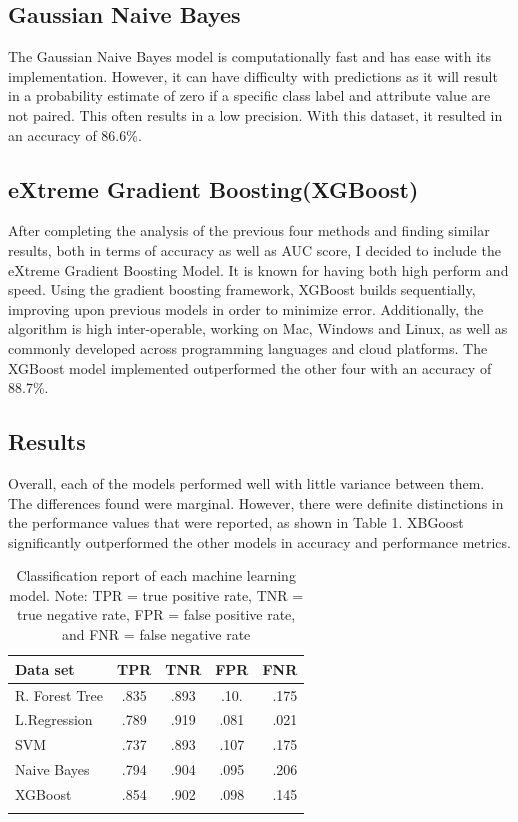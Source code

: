 \documentclass{article}
\begin{document}
\subsection{Gaussian Naive Bayes}
The Gaussian Naive Bayes model is computationally fast and has ease with its implementation. However, it can have difficulty with predictions as it will result in a probability estimate of zero if a specific class label and attribute value are not paired. This often results in a low precision. With this dataset, it resulted in an accuracy of 86.6\%. 
\subsection{eXtreme Gradient Boosting(XGBoost)}
After completing the analysis of the previous four methods and finding similar results, both in terms of accuracy as well as AUC score, I decided to include the eXtreme Gradient Boosting Model. It is known for having both high perform and speed. Using the gradient boosting framework, XGBoost builds sequentially, improving upon previous models in order to minimize error. Additionally, the algorithm is high inter-operable, working on Mac, Windows and Linux, as well as commonly developed across programming languages and cloud platforms. The XGBoost model implemented outperformed the other four with an accuracy of 88.7\%.
\subsection{Results}
Overall, each of the models performed well with little variance between them. The differences found were marginal. However, there were definite distinctions in the performance values that were reported, as shown in Table 1. XBGoost significantly outperformed the other models in accuracy and performance metrics. 

\begin{table}[t]
\caption{Classification report of each machine learning model. Note: TPR = true positive rate, TNR = true negative rate, FPR = false positive rate, and FNR = false negative rate}
\label{sample-table}
\vskip 0.15in
\begin{center}
\begin{small}
\begin{sc}
\begin{tabular}{lcccr}
\hline
\abovespace\belowspace
Data set & TPR & TNR & FPR & FNR\\
\hline
\abovespace
R. Forest Tree    & .835 & .893  & .10. &.175 \\
L.Regression & .789& .919 &.081 &.021\\
SVM    & .737& .893 &.107&.175\\
Naive Bayes    & .794& .904 &.095 &.206       \\
XGBoost     & .854& .902 &.098 &.145\\
\belowspace
\end{tabular}
\end{sc}
\end{small}
\end{center}
\vskip -0.1in
\end{table}
\end{document}
